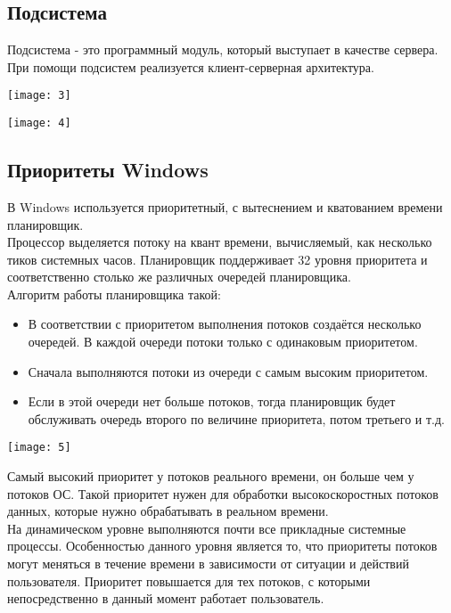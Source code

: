 \documentclass[a4paper]{article}
\begin{document}
\subsection{Подсистема}
Подсистема - это программный модуль, который выступает в качестве сервера. При помощи подсистем реализуется клиент-серверная архитектура.
\begin{center}
	\texttt{[image: 3]}
\end{center}
\begin{center}
	\texttt{[image: 4]}
\end{center}
\subsection{Приоритеты Windows}
В Windows используется приоритетный, с вытеснением и кватованием времени планировщик.\\
Процессор выделяется потоку на квант времени, вычисляемый, как несколько тиков системных часов. Планировщик поддерживает 32 уровня приоритета и соответственно столько же различных очередей планировщика.\\
Алгоритм работы планировщика такой:\\
\begin{itemize}	
\item В соответствии с приоритетом выполнения потоков создаётся несколько очередей. В каждой очереди потоки только с одинаковым приоритетом.\\
\item Сначала выполняются потоки из очереди с самым высоким приоритетом.\\
\item Если в этой очереди нет больше потоков, тогда планировщик будет обслуживать очередь второго по величине приоритета, потом третьего и т.д.\\
\end{itemize}
\begin{center}
	\texttt{[image: 5]}
\end{center}
Самый высокий приоритет у потоков реального времени, он больше чем у потоков ОС. Такой приоритет нужен для обработки высокоскоростных потоков данных, которые нужно обрабатывать в реальном времени.\\
На динамическом уровне выполняются почти все прикладные системные процессы. Особенностью данного уровня является то, что приоритеты потоков могут меняться в течение времени в зависимости от ситуации и действий пользователя. Приоритет повышается для тех потоков, с которыми непосредственно в данный момент работает пользователь.\\
\end{document}
